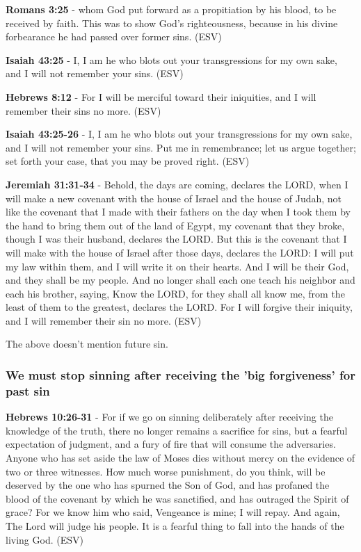\documentclass[11pt]{article}
\begin{document}
\textbf{Romans 3:25} -  whom God put forward as a propitiation by his blood, to be received by faith.  This was to show God's righteousness, because in his divine forbearance he had passed over former sins.  (ESV)

\textbf{Isaiah 43:25} -  I, I am he who blots out your transgressions for my own sake, and I will not remember your sins.  (ESV)

\textbf{Hebrews 8:12} -  For I will be merciful toward their iniquities, and I will remember their sins no more.  (ESV)

\textbf{Isaiah 43:25-26} -  I, I am he who blots out your transgressions for my own sake, and I will not remember your sins.  Put me in remembrance; let us argue together; set forth your case, that you may be proved right.  (ESV)

\textbf{Jeremiah 31:31-34} -  Behold, the days are coming, declares the LORD, when I will make a new covenant with the house of Israel and the house of Judah, not like the covenant that I made with their fathers on the day when I took them by the hand to bring them out of the land of Egypt, my covenant that they broke, though I was their husband, declares the LORD.  But this is the covenant that I will make with the house of Israel after those days, declares the LORD: I will put my law within them, and I will write it on their hearts.  And I will be their God, and they shall be my people.  And no longer shall each one teach his neighbor and each his brother, saying, Know the LORD, for they shall all know me, from the least of them to the greatest, declares the LORD.  For I will forgive their iniquity, and I will remember their sin no more.  (ESV)

The above doesn't mention future sin.

\subsubsection{We must stop sinning after receiving the 'big forgiveness' for past sin}
\label{sec:org0798b16}
\textbf{Hebrews 10:26-31} -  For if we go on sinning deliberately after receiving the knowledge of the truth, there no longer remains a sacrifice for sins, but a fearful expectation of judgment, and a fury of fire that will consume the adversaries.  Anyone who has set aside the law of Moses dies without mercy on the evidence of two or three witnesses.  How much worse punishment, do you think, will be deserved by the one who has spurned the Son of God, and has profaned the blood of the covenant by which he was sanctified, and has outraged the Spirit of grace?  For we know him who said, Vengeance is mine; I will repay.  And again, The Lord will judge his people.  It is a fearful thing to fall into the hands of the living God.  (ESV)
\end{document}
